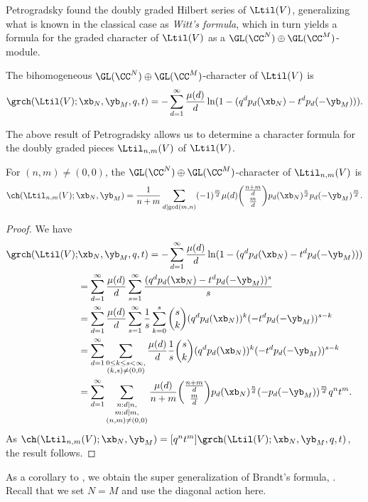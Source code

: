 Petrogradsky \cite{Pet} found the doubly graded Hilbert series of $\Ltil(V)$, generalizing what is known in the classical case as \emph{Witt's formula}, which in turn yields a formula for the graded character of $\Ltil(V)$ as a $\GL(\CC^N) \oplus \GL(\CC^M)$-module.
\begin{thm}\label{thm:free-super-lie-char}
    The bihomogeneous $\GL(\CC^N) \oplus \GL(\CC^M)$-character of $\Ltil(V)$ is
    \[
    \grch(\Ltil(V);\xb_N,\yb_M,q,t) = -\sum_{d=1}^\infty \frac{\mu(d)}{d} \ln(1-(q^dp_d(\xb_N) - t^dp_d(-\yb_M))).
    \]
\end{thm}
The above result of Petrogradsky allows us to determine a character formula for the doubly graded pieces $\Ltil_{n,m}(V)$ of $\Ltil(V)$.
\begin{thm}\label{thm:super-bi-brandt}
    For $(n,m) \neq (0,0)$, the $\GL(\CC^N) \oplus \GL(\CC^M)$-character of $\Ltil_{n,m}(V)$ is
    \[
    \ch(\Ltil_{n,m}(V);\xb_N,\yb_M) = \frac{1}{n+m} \sum_{d \mid \gcd(m,n)} (-1)^\frac{m}{d} \mu(d) \binom{\frac{n+m}{d}}{\frac{m}{d}} p_d(\xb_N)^\frac{n}{d}p_d(-\yb_M)^\frac{m}{d}.
    \]
\end{thm}
\begin{proof}
    We have
    \begin{align*}
    \grch(\Ltil(V);&\xb_N,\yb_M,q,t) = -\sum_{d=1}^\infty \frac{\mu(d)}{d} \ln(1-(q^dp_d(\xb_N) - t^dp_d(-\yb_M))) \\
    &= \sum_{d=1}^\infty \frac{\mu(d)}{d} \sum_{s=1}^\infty \frac{(q^dp_d(\xb_N) - t^dp_d(-\yb_M))^s}{s} \\
    &= \sum_{d=1}^\infty \frac{\mu(d)}{d} \sum_{s=1}^\infty \frac{1}{s} \sum_{k=0}^s {\binom{s}{k}}(q^dp_d(\xb_N))^k(-t^dp_d(-\yb_M))^{s-k} \\
    &= \sum_{d=1}^\infty \sum_{\substack{0 \le k \le s < \infty, \\ (k,s) \neq (0,0)}} \frac{\mu(d)}{d} \frac{1}{s} {\binom{s}{k}} (q^dp_d(\xb_N))^k(-t^dp_d(-\yb_M))^{s-k} \\
    &= \sum_{d=1}^\infty \sum_{\substack{n : d \mid n, \\ m : d \mid m, \\ (n,m) \neq (0,0)}} \frac{\mu(d)}{n+m} \binom{\frac{n+m}{d}}{\frac{m}{d}} p_d(\xb_N)^\frac{n}{d}(-p_d(-\yb_M))^\frac{m}{d} q^nt^m.
    \end{align*}
    As $\ch(\Ltil_{n,m}(V);\xb_N,\yb_M) = [q^nt^m]\grch(\Ltil(V);\xb_N,\yb_M,q,t)$, the result follows.
\end{proof}
As a corollary to , we obtain the super generalization of Brandt's formula, . Recall that we set $N=M$ and use the diagonal action here.
